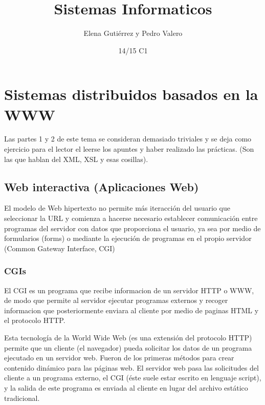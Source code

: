 \documentclass{apuntes}
\title{Sistemas Informaticos}
\author{Elena Gutiérrez y Pedro Valero}
\date{14/15 C1}
\begin{document}
\pagestyle{plain}
\maketitle

\tableofcontents
\newpage
\setcounter{chapter}{1}
\chapter{Sistemas distribuidos basados en la WWW}

Las partes 1 y 2 de este tema se consideran demasiado triviales y se deja como ejercicio para el lector el leerse los apuntes y haber realizado las prácticas. (Son las que hablan del XML, XSL y esas cosillas).

\setcounter{section}{2}
\section{Web interactiva (Aplicaciones Web)}
El modelo de Web hipertexto no permite más iteracción del usuario que seleccionar la URL y comienza a hacerse necesario establecer comunicación entre programas del servidor con datos que proporciona el usuario, ya sea por medio de formularios (forms) o mediante la ejecución de programas en el propio servidor (Common Gateway Interface, CGI)

\subsection{CGIs}
\begin{defn}[CGI]
El CGI es un programa que recibe informacion de un servidor HTTP o WWW, de modo que permite al servidor ejecutar programas externos y recoger informacion que posteriormente enviara al cliente por medio de paginas HTML y el protocolo HTTP. 
\end{defn}

Esta tecnología de la World Wide Web (es una extensión del protocolo HTTP) permite que un cliente (el navegador) pueda solicitar los datos de un programa ejecutado en un servidor web. Fueron de los primeras métodos para crear contenido dinámico para las páginas web. El servidor web pasa las solicitudes del cliente a un programa externo, el CGI  (éste suele estar escrito en lenguaje script), y la salida de este programa es enviada al cliente en lugar del archivo estático tradicional.
\end{document}
